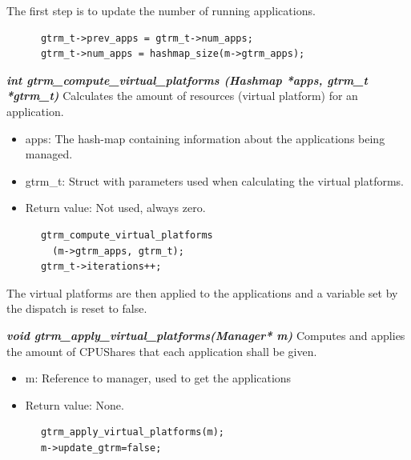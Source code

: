 \documentclass[nobiblatex]{LTHthesis}
\begin{document}
The first step is to update the number of running applications.
\begin{lstlisting}
      gtrm_t->prev_apps = gtrm_t->num_apps;
      gtrm_t->num_apps = hashmap_size(m->gtrm_apps);
\end{lstlisting}

\begin{framed}
	\begin{flushleft}
			\textbf{\emph{{int gtrm\_compute\_virtual\_platforms \newline
      (Hashmap *apps, gtrm\_t *gtrm\_t)}}} \newline
			Calculates the amount of resources (virtual platform) for an application.
			\begin{itemize}
			\item apps: The hash-map containing information about the
        applications being managed.
			\item gtrm\_t: Struct with parameters used when calculating the 
        virtual platforms.
			\item Return value: Not used, always zero.
			\end{itemize}
		\end{flushleft}	
\end{framed}

\begin{lstlisting}
      gtrm_compute_virtual_platforms
        (m->gtrm_apps, gtrm_t);
      gtrm_t->iterations++;
\end{lstlisting}

The virtual platforms are then applied to the applications and a variable set by the dispatch is reset to false.
\begin{framed}
	\begin{flushleft}
			\textbf{\emph{{void gtrm\_apply\_virtual\_platforms(Manager* m)}}}
      \newline
			Computes and applies the amount of CPUShares that each application 
        shall be given.
			\begin{itemize}
			\item m: Reference to manager, used to get the applications
			\item Return value: None.
			\end{itemize}
	\end{flushleft}	
\end{framed}
\begin{lstlisting}
      gtrm_apply_virtual_platforms(m); 
      m->update_gtrm=false;																	
\end{lstlisting}
\end{document}
